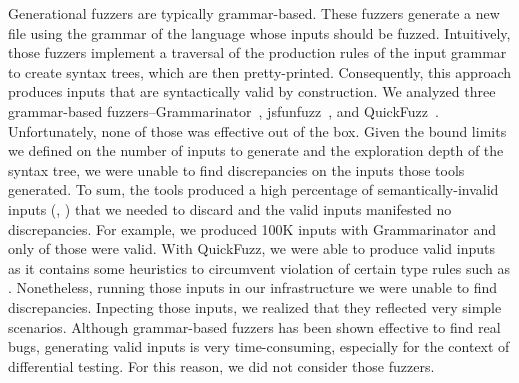 \documentclass[10pt,conference,anonymous]{IEEEtran}
\begin{document}
Generational fuzzers are typically grammar-based. These fuzzers
generate a new file using the grammar of the language whose inputs
should be fuzzed. Intuitively, those fuzzers implement a traversal of
the production rules of the input grammar to create syntax trees,
which are then pretty-printed. Consequently, this approach produces
inputs that are syntactically valid by construction.  We analyzed
three grammar-based fuzzers--Grammarinator~\cite{grammarinator},
jsfunfuzz~\cite{jsfunfuzz}, and
QuickFuzz~\cite{quickfuzz,grieco2016quickfuzz}.  Unfortunately, none
of those was effective out of the box. Given the bound limits we
defined on the number of inputs to generate and the exploration depth
of the syntax tree, we were unable to find discrepancies on the inputs
those tools generated. To sum, the tools produced a high percentage of
semantically-invalid inputs (\eg{}, ) that we needed to
discard and the valid inputs manifested no discrepancies. For example,
we produced 100K inputs with Grammarinator and only  of those
were valid. With QuickFuzz, we were able to produce 
valid inputs as it contains some heuristics to circumvent violation of
certain type rules such as . Nonetheless, running those inputs in our infrastructure
we were unable to find discrepancies. Inpecting those inputs, we
realized that they reflected very simple scenarios. Although grammar-based fuzzers has been shown effective to
find real bugs, generating
valid inputs is very time-consuming, especially for the context of
differential testing. For this reason, we did not consider those fuzzers.

\end{document}
